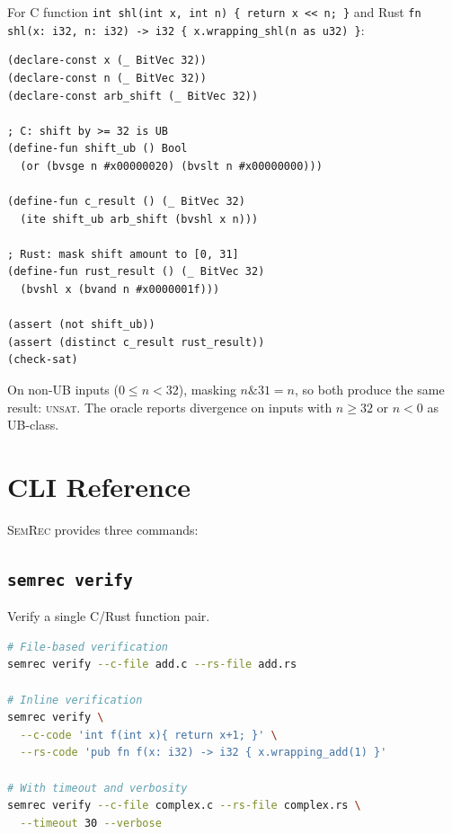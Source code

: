 \documentclass[11pt]{article}
\newcommand{\semrec}{\textsc{SemRec}}
\newcommand{\UNSAT}{\textsc{unsat}}
\begin{document}
For C function \texttt{int shl(int x, int n) \{ return x << n; \}}
and Rust \texttt{fn shl(x: i32, n: i32) -> i32 \{ x.wrapping\_shl(n as u32) \}}:

\begin{lstlisting}[language={},caption={SMT-LIB encoding for shift comparison.},
  label={lst:smt-shift}]
(declare-const x (_ BitVec 32))
(declare-const n (_ BitVec 32))
(declare-const arb_shift (_ BitVec 32))

; C: shift by >= 32 is UB
(define-fun shift_ub () Bool
  (or (bvsge n #x00000020) (bvslt n #x00000000)))

(define-fun c_result () (_ BitVec 32)
  (ite shift_ub arb_shift (bvshl x n)))

; Rust: mask shift amount to [0, 31]
(define-fun rust_result () (_ BitVec 32)
  (bvshl x (bvand n #x0000001f)))

(assert (not shift_ub))
(assert (distinct c_result rust_result))
(check-sat)
\end{lstlisting}

On non-UB inputs ($0 \leq n < 32$), masking $n \mathbin{\&} 31 = n$, so
both produce the same result: \UNSAT{}.  The oracle reports divergence on
inputs with $n \geq 32$ or $n < 0$ as UB-class.

\section{CLI Reference}\label{app:cli}

\semrec{} provides three commands:

\subsection{\texttt{semrec verify}}

Verify a single C/Rust function pair.

\begin{lstlisting}[language=bash,numbers=none]
# File-based verification
semrec verify --c-file add.c --rs-file add.rs

# Inline verification
semrec verify \
  --c-code 'int f(int x){ return x+1; }' \
  --rs-code 'pub fn f(x: i32) -> i32 { x.wrapping_add(1) }'

# With timeout and verbosity
semrec verify --c-file complex.c --rs-file complex.rs \
  --timeout 30 --verbose
\end{lstlisting}
\end{document}
